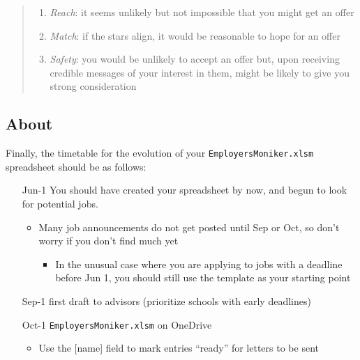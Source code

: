 \documentclass{\classes/econtex}
\begin{document}
\begin{quote}
\begin{enumerate}
\item \emph{Reach}: it seems unlikely but not impossible that you might get an offer
\item \emph{Match}: if the stars align, it would be reasonable to hope for an offer
  \item \emph{Safety}: you would be unlikely to accept an offer but, upon receiving credible messages of your interest in them, might be likely to give you strong consideration
  \end{enumerate}
  \end{quote}

  \hypertarget{about-employersmoniker}{}
  \subsection*{About \EMW}

  Finally, the timetable for the evolution of your \texttt{EmployersMoniker.xlsm} spreadsheet should be as follows:
\hypertarget{employers-list-timetable}{}  
\begin{enumerate}
\item[Jun-1] You should have created your {\EMW} spreadsheet by now, and begun to look for potential jobs.
  \begin{itemize}
  \item Many job announcements do not get posted until Sep or Oct, so don't worry if you don't find much yet
  \begin{itemize}
  \item In the unusual case where you are applying to jobs with a deadline before Jun 1, you should still use the {\Employers} template as your starting point
  \end{itemize}
  \end{itemize}
\item[Sep-1] first draft to advisors (prioritize schools with early deadlines)
\item[Oct-1] \texttt{EmployersMoniker.xlsm} on OneDrive
  \begin{itemize}
  \item Use the [name] field to mark entries ``ready'' for letters to be sent
  \end{itemize} 
\end{enumerate}


\pagebreak
\end{document}
